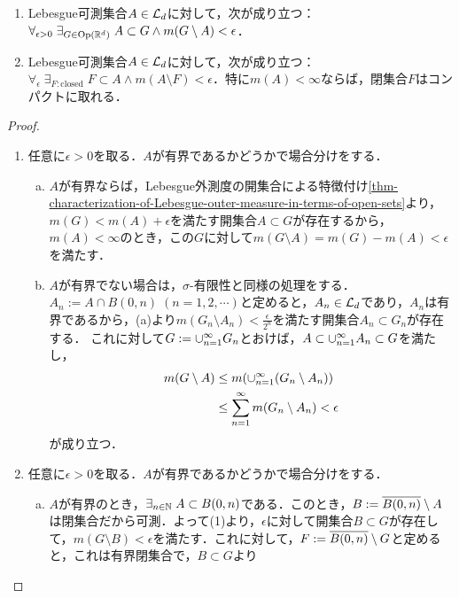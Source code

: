 \documentclass[uplatex, dvipdfmx]{jsreport}
\begin{document}
\begin{lemma}[閉核と開包は任意精度でとれる]\mbox{}\label{lemma-closed-kernel-and-open-closure}
    \begin{enumerate}
        \item Lebesgue可測集合$A\in\mathcal{L}_d$に対して，次が成り立つ：$\forall_{\epsilon>0}\;\exists_{G\in\mathrm{Op}(\mathbb{R}^d)}\;A\subset G\land m(G\setminus A)<\epsilon$．
        \item Lebesgue可測集合$A\in\mathcal{L}_d$に対して，次が成り立つ：$\forall_{\epsilon}\;\exists_{F:\mathrm{closed}}\;F\subset A\land m(A\setminus F)<\epsilon$．特に$m(A)<\infty$ならば，閉集合$F$はコンパクトに取れる．
    \end{enumerate}
\end{lemma}
\begin{proof}\mbox{}
    \begin{enumerate}
        \item 任意に$\epsilon>0$を取る．$A$が有界であるかどうかで場合分けをする．
        \begin{enumerate}[(a)]
            \item $A$が有界ならば，Lebesgue外測度の開集合による特徴付け\ref{thm-characterization-of-Lebesgue-outer-measure-in-terms-of-open-sets}より，$m(G)<m(A)+\epsilon$を満たす開集合$A\subset G$が存在するから，
            $m(A)<\infty$のとき，この$G$に対して$m(G\setminus A)=m(G)-m(A)<\epsilon$を満たす．
            \item $A$が有界でない場合は，$\sigma$-有限性と同様の処理をする．$A_n:=A\cap B(0,n)\;(n=1,2,\cdots)$と定めると，$A_n\in\mathcal{L}_d$であり，$A_n$は有界であるから，(a)より$m(G_n\setminus A_n)<\frac{\epsilon}{2^n}$を満たす開集合$A_n\subset G_n$が存在する．
            これに対して$G:=\cup_{n=1}^\infty G_n$とおけば，$A\subset\cup_{n=1}^\infty A_n\subset G$を満たし，
            \begin{align*}
                m(G\setminus A)&\le m(\cup_{n=1}^\infty(G_n\setminus A_n))\\
                &\le\sum_{n=1}^\infty m(G_n\setminus A_n)<\epsilon
            \end{align*}
            が成り立つ．
        \end{enumerate}
        \item 任意に$\epsilon>0$を取る．$A$が有界であるかどうかで場合分けをする．
        \begin{enumerate}[(a)]
            \item $A$が有界のとき，$\exists_{n\in\mathbb{N}}\;A\subset B(0,n)$である．このとき，$B:=\overline{B(0,n)}\setminus A$は閉集合だから可測．よって(1)より，$\epsilon$に対して開集合$B\subset G$が存在して，$m(G\setminus B)<\epsilon$を満たす．これに対して，$F:=\overline{B(0,n)}\setminus G$と定めると，これは有界閉集合で，$B\subset G$より

\end{enumerate}
\end{enumerate}
\end{proof}
\end{document}
